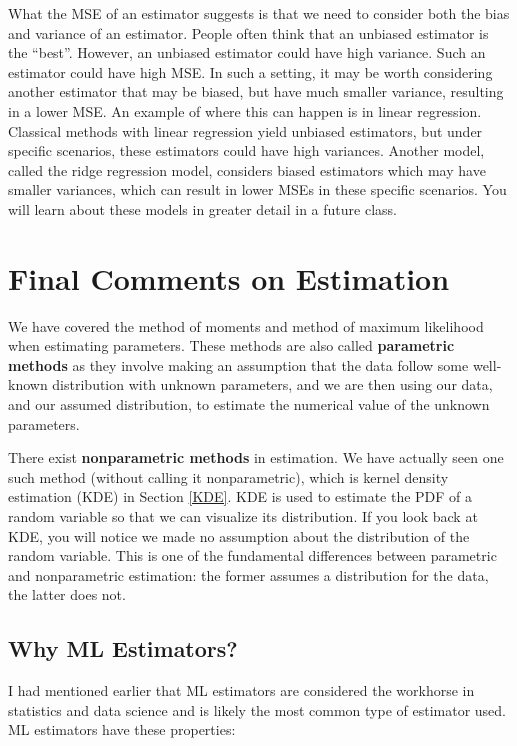 \documentclass[
]{book}
\begin{document}
What the MSE of an estimator suggests is that we need to consider both the bias and variance of an estimator. People often think that an unbiased estimator is the ``best''. However, an unbiased estimator could have high variance. Such an estimator could have high MSE. In such a setting, it may be worth considering another estimator that may be biased, but have much smaller variance, resulting in a lower MSE. An example of where this can happen is in linear regression. Classical methods with linear regression yield unbiased estimators, but under specific scenarios, these estimators could have high variances. Another model, called the ridge regression model, considers biased estimators which may have smaller variances, which can result in lower MSEs in these specific scenarios. You will learn about these models in greater detail in a future class.

\hypertarget{estcomments}{%
\section{Final Comments on Estimation}\label{estcomments}}

We have covered the method of moments and method of maximum likelihood when estimating parameters. These methods are also called \textbf{parametric methods} as they involve making an assumption that the data follow some well-known distribution with unknown parameters, and we are then using our data, and our assumed distribution, to estimate the numerical value of the unknown parameters.

There exist \textbf{nonparametric methods} in estimation. We have actually seen one such method (without calling it nonparametric), which is kernel density estimation (KDE) in Section \ref{KDE}. KDE is used to estimate the PDF of a random variable so that we can visualize its distribution. If you look back at KDE, you will notice we made no assumption about the distribution of the random variable. This is one of the fundamental differences between parametric and nonparametric estimation: the former assumes a distribution for the data, the latter does not.

\hypertarget{why-ml-estimators}{%
\subsection{Why ML Estimators?}\label{why-ml-estimators}}

I had mentioned earlier that ML estimators are considered the workhorse in statistics and data science and is likely the most common type of estimator used. ML estimators have these properties:
\end{document}
